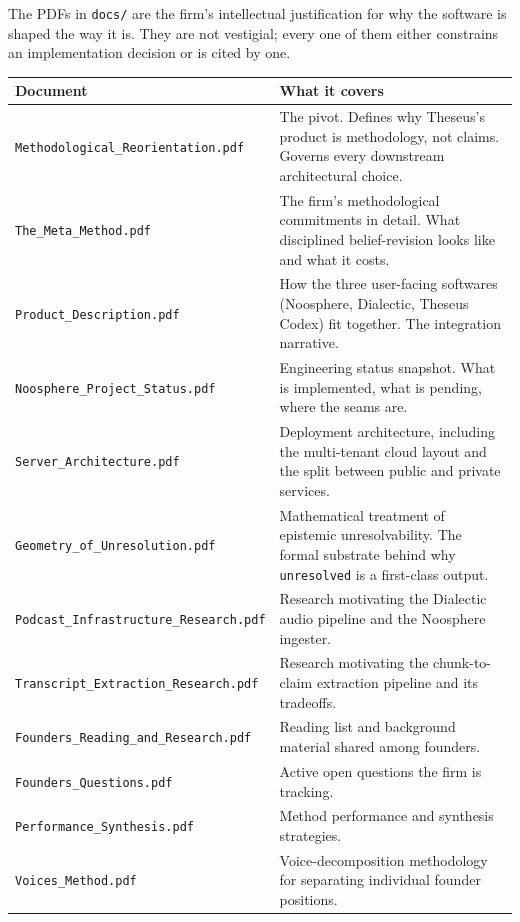 \documentclass[11pt,letterpaper]{article}
\newcommand{\file}[1]{\texttt{#1}}
\begin{document}
The PDFs in \file{docs/} are the firm's intellectual justification for why the software is shaped the way it is. They are not vestigial; every one of them either constrains an implementation decision or is cited by one.

\begin{longtable}{p{5cm} p{9.5cm}}
\toprule
\textbf{Document} & \textbf{What it covers} \\
\midrule
\endhead
\file{Methodological\_Reorientation.pdf} & The pivot. Defines why Theseus's product is methodology, not claims. Governs every downstream architectural choice. \\
\file{The\_Meta\_Method.pdf}             & The firm's methodological commitments in detail. What disciplined belief-revision looks like and what it costs. \\
\file{Product\_Description.pdf}          & How the three user-facing softwares (Noosphere, Dialectic, Theseus Codex) fit together. The integration narrative. \\
\file{Noosphere\_Project\_Status.pdf}    & Engineering status snapshot. What is implemented, what is pending, where the seams are. \\
\file{Server\_Architecture.pdf}          & Deployment architecture, including the multi-tenant cloud layout and the split between public and private services. \\
\file{Geometry\_of\_Unresolution.pdf}    & Mathematical treatment of epistemic unresolvability. The formal substrate behind why \texttt{unresolved} is a first-class output. \\
\file{Podcast\_Infrastructure\_Research.pdf} & Research motivating the Dialectic audio pipeline and the Noosphere ingester. \\
\file{Transcript\_Extraction\_Research.pdf}  & Research motivating the chunk-to-claim extraction pipeline and its tradeoffs. \\
\file{Founders\_Reading\_and\_Research.pdf}  & Reading list and background material shared among founders. \\
\file{Founders\_Questions.pdf}           & Active open questions the firm is tracking. \\
\file{Performance\_Synthesis.pdf}        & Method performance and synthesis strategies. \\
\file{Voices\_Method.pdf}               & Voice-decomposition methodology for separating individual founder positions. \\
\bottomrule
\end{longtable}
\end{document}
